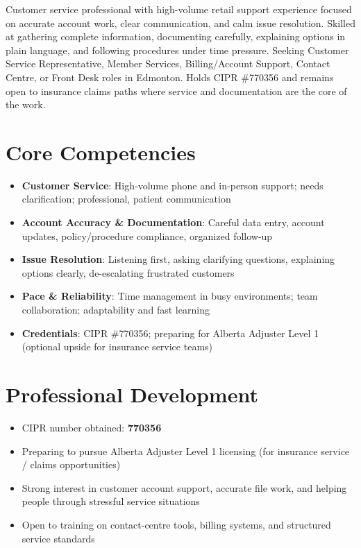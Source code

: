 \documentclass[11pt,a4paper,sans]{moderncv}
\begin{document}
\makecvtitle

\vspace{6pt}
\small{Customer service professional with high-volume retail support experience focused on accurate account work, clear communication, and calm issue resolution. Skilled at gathering complete information, documenting carefully, explaining options in plain language, and following procedures under time pressure. Seeking Customer Service Representative, Member Services, Billing/Account Support, Contact Centre, or Front Desk roles in Edmonton. Holds CIPR \#770356 and remains open to insurance claims paths where service and documentation are the core of the work.}

\section{Core Competencies}
\vspace{1pt}
\begin{itemize}
\item \textbf{Customer Service}: High-volume phone and in-person support; needs clarification; professional, patient communication
\item \textbf{Account Accuracy \& Documentation}: Careful data entry, account updates, policy/procedure compliance, organized follow-up
\item \textbf{Issue Resolution}: Listening first, asking clarifying questions, explaining options clearly, de-escalating frustrated customers
\item \textbf{Pace \& Reliability}: Time management in busy environments; team collaboration; adaptability and fast learning
\item \textbf{Credentials}: CIPR \#770356; preparing for Alberta Adjuster Level 1 (optional upside for insurance service teams)
\end{itemize}

\section{Professional Development}
\vspace{1pt}
\begin{itemize}
\item CIPR number obtained: \textbf{770356}
\item Preparing to pursue Alberta Adjuster Level 1 licensing (for insurance service / claims opportunities)
\item Strong interest in customer account support, accurate file work, and helping people through stressful service situations
\item Open to training on contact-centre tools, billing systems, and structured service standards
\end{itemize}
\end{document}
